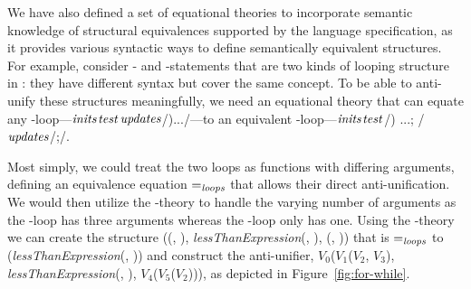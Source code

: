 We have also defined a set of equational theories to incorporate semantic knowledge of structural equivalences supported by the  language specification, as it provides various syntactic ways to define semantically equivalent structures. 
For example, consider - and -statements that are two kinds of looping structure in : they have different syntax but cover the same concept. To be able to anti-unify these structures meaningfully, we need an equational theory that can equate any -loop---$\mathit{inits}$\code{; }$\mathit{test}$\code{; }$\mathit{updates}$\code/){...}/---to an equivalent -loop---$\mathit{inits}$$\mathit{test}$\code/) {...; /$\mathit{updates}$\code/;}/.  


Most simply, we could treat the two loops as functions with differing arguments, defining an equivalence equation $=_{\mathit{loops}}$ that allows their direct anti-unification. We would then utilize the \NIL{}-theory to handle the varying number of arguments as the -loop has three arguments whereas the -loop only has one. Using the \NIL{}-theory we can create the structure (\NIL{}(\NIL{}, \NIL{}), \textit{lessThanExpression}(, ), \NIL{}(\NIL{}, \NIL{})) that is $=_{\mathit{loops}}$ to (\textit{lessThanExpression}(, )) and construct the anti-unifier, $V_0$($V_1$($V_2$, $V_3$), \textit{lessThanExpression}(, ), $V_4$($V_5$($V_2$))), as depicted in Figure~\ref{fig:for-while}.

